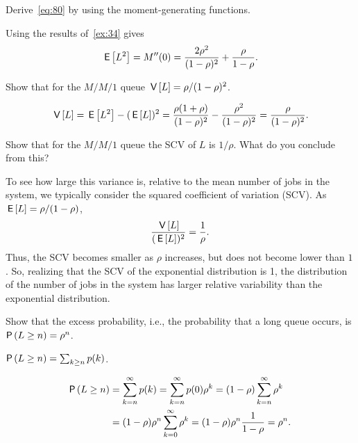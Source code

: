 \begin{extra} Derive~\cref{eq:80} by
 using the moment-generating functions.
\begin{solution}
Using the results of~\cref{ex:34} gives
\begin{equation*}
 \,\mathsf{E}\left[L^2\right]= M''(0)= \frac{2\rho^2}{(1-\rho)^2} + \frac{\rho}{1-\rho}.
\end{equation*}
\end{solution}
\end{extra}

\begin{extra} Show that for the $M/M/1$ queue $\,\mathsf{V}\left[L\right] = \rho/(1-\rho)^2$.
\begin{solution}
\begin{equation*}
\,\mathsf{V}\left[L\right] = \,\mathsf{E}\left[L^2\right] - (\,\mathsf{E}\left[L\right])^2 = \frac{\rho(1+\rho)}{(1-\rho)^2}-\frac{\rho^2}{(1-\rho)^2} = \frac{\rho}{(1-\rho)^2}.
\end{equation*}
\end{solution}
\end{extra}

\begin{extra}
Show that for the $M/M/1$ queue the SCV of $L$ is $1/\rho$. What do you conclude from this?
\begin{solution}
To see how large this variance is, relative to the mean number of jobs
in the system, we typically consider the squared coefficient of
variation (SCV). As $\,\mathsf{E}\left[L\right] = \rho/(1-\rho)$,
\begin{equation*}
 \frac{\,\mathsf{V}\left[L\right]}{(\,\mathsf{E}\left[L\right])^2} = \frac 1 \rho.
\end{equation*}
Thus, the SCV becomes smaller as $\rho$ increases, but does not become
lower than $1$. So, realizing that the SCV of the exponential
distribution is 1, the distribution of the number of jobs in the
system has larger relative variability than the exponential
distribution.
\end{solution}
\end{extra}


\begin{extra}
 Show that the excess probability, i.e., the probability that a long queue occurs, is 
$\P{L\geq n} = \rho^n$.
\begin{hint}
$\P{L\geq n} = \sum_{k\geq n} p(k)$.
\end{hint}
\begin{solution}
 \begin{equation*}
 \begin{split}
 \P{L\geq n} 
 &= \sum_{k=n}^\infty p(k) = \sum_{k=n}^\infty p(0)\rho^k = (1-\rho)\sum_{k=n}^\infty \rho^k \\
 &= (1-\rho)\rho^n \sum_{k=0}^\infty\rho^k = (1-\rho) \rho^n \frac1{1-\rho} = \rho^n.
\end{split}
\end{equation*}
\end{solution}
\end{extra}


